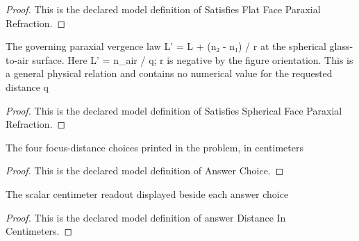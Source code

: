 \begin{proof}
  This is the declared model definition of Satisfies Flat Face Paraxial Refraction.
\end{proof}
\begin{definition}
  \label{def:physics:phyx-mini-0033:phyxminiproblems-problemphyxmini0033-satisfiessphericalfaceparaxialrefraction}
  The governing paraxial vergence law L' = L + (n₂ - n₁) / r at the spherical glass-to-air surface. Here L' = n\_air / q; r is negative by the figure orientation. This is a general physical relation and contains no numerical value for the requested distance q
\end{definition}
\begin{proof}
  This is the declared model definition of Satisfies Spherical Face Paraxial Refraction.
\end{proof}
\begin{definition}
  \label{def:physics:phyx-mini-0033:phyxminiproblems-problemphyxmini0033-answerchoice}
  The four focus-distance choices printed in the problem, in centimeters
\end{definition}
\begin{proof}
  This is the declared model definition of Answer Choice.
\end{proof}
\begin{definition}
  \label{def:physics:phyx-mini-0033:phyxminiproblems-problemphyxmini0033-answerdistanceincentimeters}
  The scalar centimeter readout displayed beside each answer choice
\end{definition}
\begin{proof}
  This is the declared model definition of answer Distance In Centimeters.
\end{proof}
